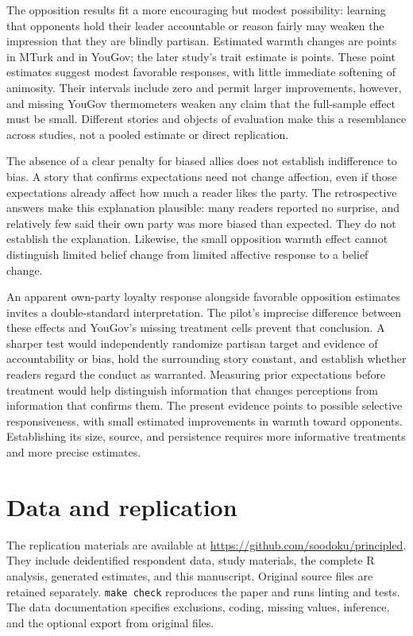 \documentclass[11pt]{article}
\begin{document}
The opposition results fit a more encouraging but modest possibility: learning that opponents hold their leader accountable or reason fairly may weaken the impression that they are blindly partisan. Estimated warmth changes are \MtOutEstimate{} points in MTurk and \YgOutFtEstimate{} in YouGov; the later study's trait estimate is \YgOutTraitEstimate{} points. These point estimates suggest modest favorable responses, with little immediate softening of animosity. Their intervals include zero and permit larger improvements, however, and missing YouGov thermometers weaken any claim that the full-sample effect must be small. Different stories and objects of evaluation make this a resemblance across studies, not a pooled estimate or direct replication.

The absence of a clear penalty for biased allies does not establish indifference to bias. A story that confirms expectations need not change affection, even if those expectations already affect how much a reader likes the party. The retrospective answers make this explanation plausible: many readers reported no surprise, and relatively few said their own party was more biased than expected. They do not establish the explanation. Likewise, the small opposition warmth effect cannot distinguish limited belief change from limited affective response to a belief change.

An apparent own-party loyalty response alongside favorable opposition estimates invites a double-standard interpretation. The pilot's imprecise difference between these effects and YouGov's missing treatment cells prevent that conclusion. A sharper test would independently randomize partisan target and evidence of accountability or bias, hold the surrounding story constant, and establish whether readers regard the conduct as warranted. Measuring prior expectations before treatment would help distinguish information that changes perceptions from information that confirms them. The present evidence points to possible selective responsiveness, with small estimated improvements in warmth toward opponents. Establishing its size, source, and persistence requires more informative treatments and more precise estimates.

\section*{Data and replication}
The replication materials are available at \url{https://github.com/soodoku/principled}. They include deidentified respondent data, study materials, the complete R analysis, generated estimates, and this manuscript. Original source files are retained separately. \texttt{make check} reproduces the paper and runs linting and tests. The data documentation specifies exclusions, coding, missing values, inference, and the optional export from original files.
\end{document}
